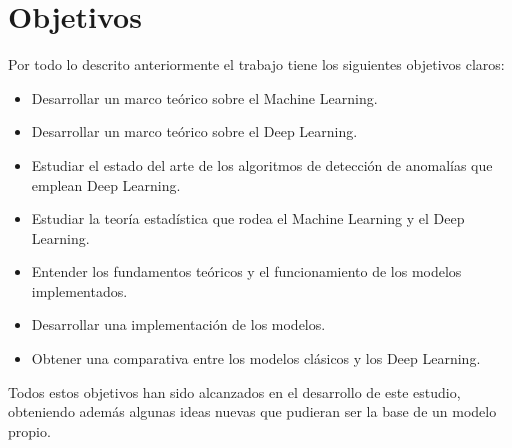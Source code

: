 \section{Objetivos}

Por todo lo descrito anteriormente el trabajo tiene los siguientes objetivos claros:

\begin{itemize}
	\item Desarrollar un marco teórico sobre el Machine Learning.
	\item Desarrollar un marco teórico sobre el Deep Learning.
	\item Estudiar el estado del arte de los algoritmos de detección de anomalías que emplean Deep Learning.
	\item Estudiar la teoría estadística que rodea el Machine Learning y el Deep Learning.
	\item Entender los fundamentos teóricos y el funcionamiento de los modelos implementados.
	\item Desarrollar una implementación de los modelos.
	\item Obtener una comparativa entre los modelos clásicos y los Deep Learning.
\end{itemize}

Todos estos objetivos han sido alcanzados en el desarrollo de este estudio, obteniendo además algunas ideas nuevas que pudieran ser la base de un modelo propio.